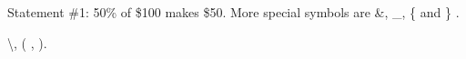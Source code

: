 \documentclass{article}
\begin{document}
Statement \#1:
50\% of \$100 makes \$50.
More special symbols are \&, \_, \{ and \} .

\textbackslash ,  ( , ).
\end{document}
